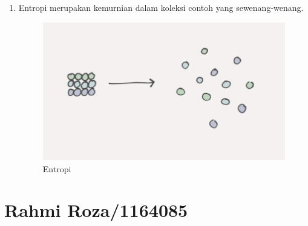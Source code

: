 \begin{enumerate}
\item Entropi merupakan kemurnian dalam koleksi contoh yang sewenang-wenang.
\begin{figure}[ht]
\centering
\includegraphics[scale=0.5]{figures/f8.jpg}
\caption{Entropi}
\label{contoh}
\end{figure}
\end{enumerate}


\section{Rahmi Roza/1164085}
